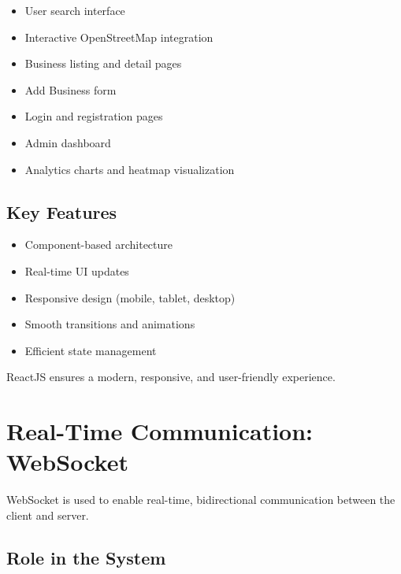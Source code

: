 \documentclass[12pt,a4paper]{report}
\begin{document}
\begin{itemize}

\item User search interface

\item Interactive OpenStreetMap integration

\item Business listing and detail pages

\item Add Business form

\item Login and registration pages

\item Admin dashboard

\item Analytics charts and heatmap visualization

\end{itemize}

\subsection*{Key Features}

\begin{itemize}

\item Component-based architecture

\item Real-time UI updates

\item Responsive design (mobile, tablet, desktop)

\item Smooth transitions and animations

\item Efficient state management

\end{itemize}

ReactJS ensures a modern, responsive, and user-friendly experience.

\section{Real-Time Communication: WebSocket}

WebSocket is used to enable real-time, bidirectional communication between the client and server.

\subsection*{Role in the System}
\end{document}
